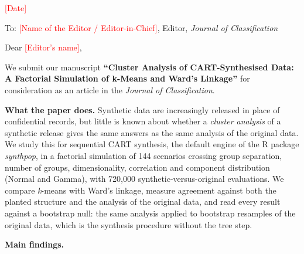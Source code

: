 \documentclass[10pt,a4paper]{article}
\begin{document}
\textcolor{red}{[Date]}

To: \textcolor{red}{[Name of the Editor / Editor-in-Chief]}, Editor, \emph{Journal of Classification}

Dear \textcolor{red}{[Editor's name]},

We submit our manuscript \textbf{``Cluster Analysis of CART-Synthesised Data: A Factorial Simulation of k-Means and Ward's Linkage''} for consideration as an article in the \emph{Journal of Classification}.

\textbf{What the paper does.} Synthetic data are increasingly released in place of confidential records, but little is known about whether a \emph{cluster analysis} of a synthetic release gives the same answers as the same analysis of the original data. We study this for sequential CART synthesis, the default engine of the R package \emph{synthpop}, in a factorial simulation of 144 scenarios crossing group separation, number of groups, dimensionality, correlation and component distribution (Normal and Gamma), with 720,000 synthetic-versus-original evaluations. We compare \emph{k}-means with Ward's linkage, measure agreement against both the planted structure and the analysis of the original data, and read every result against a bootstrap null: the same analysis applied to bootstrap resamples of the original data, which is the synthesis procedure without the tree step.

\textbf{Main findings.}
\end{document}
